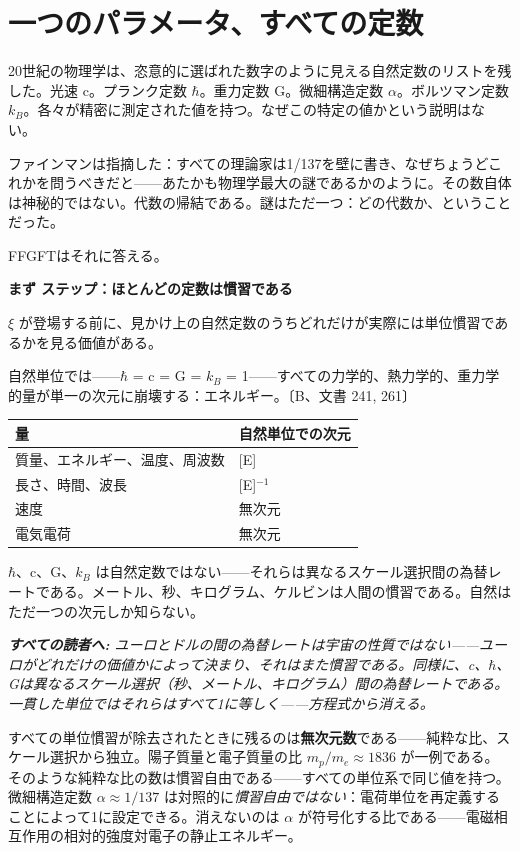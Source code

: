 \documentclass[11pt,openany]{book}
\newenvironment{laierspur}{%
  \par\vspace{4pt}%
  \noindent\small\itshape\color{blue!60!black}%
  \textbf{すべての読者へ:}\enspace\ignorespaces}{%
  \par\vspace{4pt}\normalsize\normalfont\normalcolor}
\begin{document}
\clearpage
\chapter{一つのパラメータ、すべての定数}

20世紀の物理学は、恣意的に選ばれた数字のように見える自然定数のリストを残した。光速 c。プランク定数 $\hbar$。重力定数 G。微細構造定数 $\alpha$。ボルツマン定数 $k_B$。各々が精密に測定された値を持つ。なぜこの特定の値かという説明はない。

ファインマンは指摘した：すべての理論家は1/137を壁に書き、なぜちょうどこれかを問うべきだと——あたかも物理学最大の謎であるかのように。その数自体は神秘的ではない。代数の帰結である。謎はただ一つ：どの代数か、ということだった。

FFGFTはそれに答える。

\textbf{まず ステップ：ほとんどの定数は慣習である}

$\xi$ が登場する前に、見かけ上の自然定数のうちどれだけが実際には単位慣習であるかを見る価値がある。

自然単位では——$\hbar$ = c = G = $k_B$ = 1——すべての力学的、熱力学的、重力学的量が単一の次元に崩壊する：エネルギー。〔B、文書 241, 261〕

\begin{tabular}{ll}
\toprule
量 & 自然単位での次元 \\
\midrule
質量、エネルギー、温度、周波数 & [E] \\
長さ、時間、波長 & [E]$^{-1}$ \\
速度 & 無次元 \\
電気電荷 & 無次元 \\
\bottomrule
\end{tabular}

$\hbar$、c、G、$k_B$ は自然定数ではない——それらは異なるスケール選択間の為替レートである。メートル、秒、キログラム、ケルビンは人間の慣習である。自然はただ一つの次元しか知らない。

\begin{laierspur}
ユーロとドルの間の為替レートは宇宙の性質ではない——ユーロがどれだけの価値かによって決まり、それはまた慣習である。同様に、c、$\hbar$、Gは異なるスケール選択（秒、メートル、キログラム）間の為替レートである。一貫した単位ではそれらはすべて1に等しく——方程式から消える。
\end{laierspur}

すべての単位慣習が除去されたときに残るのは\textbf{無次元数}である——純粋な比、スケール選択から独立。陽子質量と電子質量の比 $m_p/m_e \approx 1836$ が一例である。そのような純粋な比の数は慣習自由である——すべての単位系で同じ値を持つ。微細構造定数 $\alpha \approx 1/137$ は対照的に\textit{慣習自由ではない}：電荷単位を再定義することによって1に設定できる。消えないのは $\alpha$ が符号化する比である——電磁相互作用の相対的強度対電子の静止エネルギー。
\end{document}

